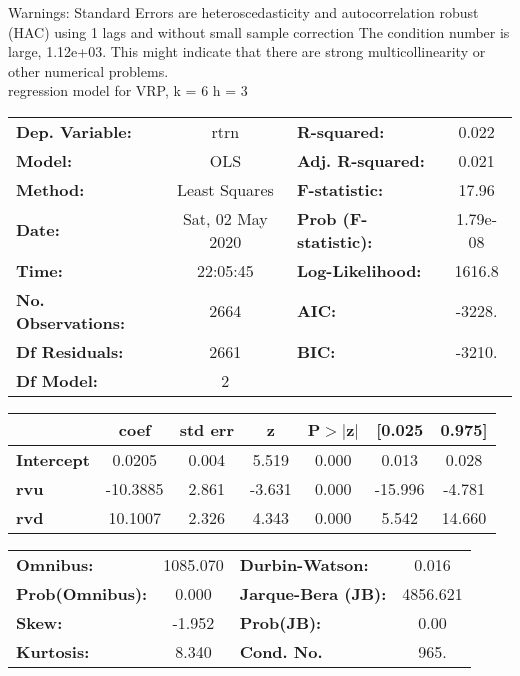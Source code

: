 Warnings: \newline
 [1] Standard Errors are heteroscedasticity and autocorrelation robust (HAC) using 1 lags and without small sample correction \newline
 [2] The condition number is large, 1.12e+03. This might indicate that there are \newline
 strong multicollinearity or other numerical problems.\\ 

regression model for VRP, k = 6 h = 3\begin{center}
\begin{tabular}{lclc}
\toprule
\textbf{Dep. Variable:}    &       rtrn       & \textbf{  R-squared:         } &     0.022   \\
\textbf{Model:}            &       OLS        & \textbf{  Adj. R-squared:    } &     0.021   \\
\textbf{Method:}           &  Least Squares   & \textbf{  F-statistic:       } &     17.96   \\
\textbf{Date:}             & Sat, 02 May 2020 & \textbf{  Prob (F-statistic):} &  1.79e-08   \\
\textbf{Time:}             &     22:05:45     & \textbf{  Log-Likelihood:    } &    1616.8   \\
\textbf{No. Observations:} &        2664      & \textbf{  AIC:               } &    -3228.   \\
\textbf{Df Residuals:}     &        2661      & \textbf{  BIC:               } &    -3210.   \\
\textbf{Df Model:}         &           2      & \textbf{                     } &             \\
\bottomrule
\end{tabular}
\begin{tabular}{lcccccc}
                   & \textbf{coef} & \textbf{std err} & \textbf{z} & \textbf{P$> |$z$|$} & \textbf{[0.025} & \textbf{0.975]}  \\
\midrule
\textbf{Intercept} &       0.0205  &        0.004     &     5.519  &         0.000        &        0.013    &        0.028     \\
\textbf{rvu}       &     -10.3885  &        2.861     &    -3.631  &         0.000        &      -15.996    &       -4.781     \\
\textbf{rvd}       &      10.1007  &        2.326     &     4.343  &         0.000        &        5.542    &       14.660     \\
\bottomrule
\end{tabular}
\begin{tabular}{lclc}
\textbf{Omnibus:}       & 1085.070 & \textbf{  Durbin-Watson:     } &    0.016  \\
\textbf{Prob(Omnibus):} &   0.000  & \textbf{  Jarque-Bera (JB):  } & 4856.621  \\
\textbf{Skew:}          &  -1.952  & \textbf{  Prob(JB):          } &     0.00  \\
\textbf{Kurtosis:}      &   8.340  & \textbf{  Cond. No.          } &     965.  \\
\bottomrule
\end{tabular}
\end{center}

